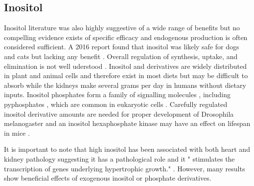 \subsection{Inositol}

Inositol literature was also highly suggestive of a wide range of
benefits but no compelling evidence exists of specific efficacy
and endogenous production is often considered sufficient.
A 2016 report found that inositol was likely safe for
dogs and cats but lacking any benefit
\cite{https://doi.org/10.2903/j.efsa.2016.4511}.
Overall regulation of synthesis,
uptake, and elimination is not well uderstood
\cite{Su_Ko_Saiardi_Regulations_inositol_2023}.
Inositol and derivatives are widely distributed in plant and
animal cells and therefore exist in most diets but
may be difficult to absorb while the kidneys make several grams
per day in humans \cite{PMC7554709} without dietary inputs.
Inositol phosphates form a family of  signalling
molecules 
\cite{LOURDES2024101001}
, including pyphosphates
\cite{Szijgyarto_Garedew_Azevedo_Influence_Inositol_Pyrophosphates_2011},
which are common in eukaryotic cells
\cite{Laha_PortelaTorres_Desfougeres_Inositol_phosphate_kinases_2021}
.
Carefully regulated inositol derivative amounts are needed for
proper development of Drosophila melanogaster \cite{PMC8565467}
and an inositol hexaphosphate kinase may have an effect on
lifespan in mice \cite{Moritoh_Oka_Yasuhara_Inositol_Hexakisphosphate_Kinase_2016}.

It is  important to note that high inositol has been
associated with both heart and kidney pathology suggesting
it has a pathological role \cite{Pouleur_Menghoum_Cumps_Plasma_inositol_elevation_2024} 
and it " stimulates the transcription of genes underlying hypertrophic growth."
\cite{Demydenko_EkhteraeiTousi_Roderick_Inositol_2022}.
However, many results show beneficial effects of exogenous
inositol or phosphate derivatives.


